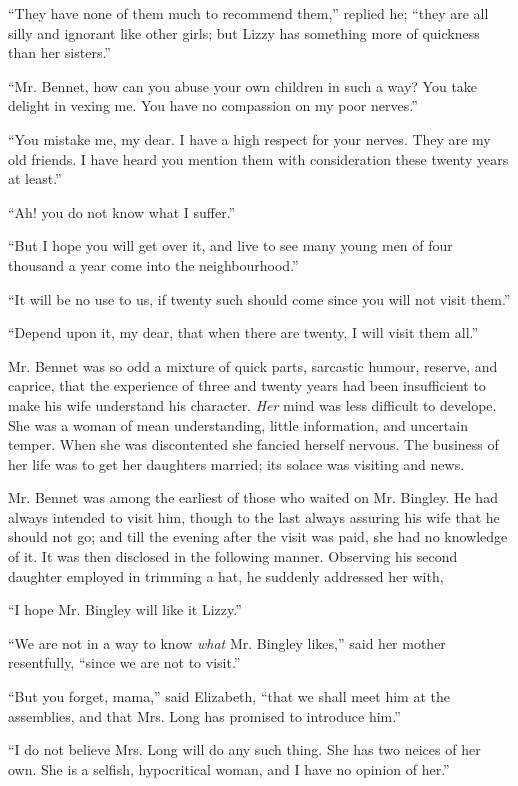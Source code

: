 “They have none of them much to recommend them,”
replied he; “they are all silly and ignorant like other
girls; but Lizzy has something more of quickness
than her sisters.”

“Mr. Bennet, how can you abuse your own children
in such a way? You take delight in vexing me. You
have no compassion on my poor nerves.”

“You mistake me, my dear. I have a high respect for
your nerves. They are my old friends. I have heard you
mention them with consideration these twenty years at
least.”

“Ah! you do not know what I suffer.”

“But I hope you will get over it, and live to see many
young men of four thousand a year come into the
neighbourhood.”

“It will be no use to us, if twenty such should come
since you will not visit them.”

“Depend upon it, my dear, that when there are twenty,
I will visit them all.”

Mr. Bennet was so odd a mixture of quick parts, sarcastic
humour, reserve, and caprice, that the experience of three
and twenty years had been insufficient to make his wife
understand his character. \textit{Her} mind was less difficult to
develope. She was a woman of mean understanding, little
information, and uncertain temper. When she was discontented
she fancied herself nervous. The business of her
life was to get her daughters married; its solace was
visiting and news.


Mr. Bennet was among the earliest of those who
waited on Mr. Bingley. He had always intended to visit
him, though to the last always assuring his wife that he
should not go; and till the evening after the visit was paid,
she had no knowledge of it. It was then disclosed in the
following manner. Observing his second daughter employed
in trimming a hat, he suddenly addressed her with,

“I hope Mr. Bingley will like it Lizzy.”

“We are not in a way to know \textit{what} Mr. Bingley likes,”
said her mother resentfully, “since we are not to visit.”

“But you forget, mama,” said Elizabeth, “that we
shall meet him at the assemblies, and that Mrs. Long has
promised to introduce him.”

“I do not believe Mrs. Long will do any such thing.
She has two neices of her own. She is a selfish, hypocritical
woman, and I have no opinion of her.”

